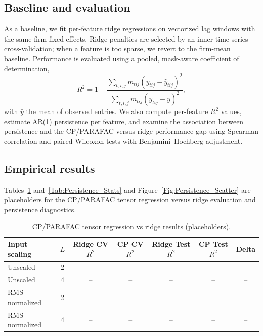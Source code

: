 \subsection{Baseline and evaluation}
\label{Section:Baseline_Eval}

As a baseline, we fit per-feature ridge regressions on vectorized lag windows with the same firm fixed effects. Ridge penalties are selected by an inner time-series cross-validation; when a feature is too sparse, we revert to the firm-mean baseline. Performance is evaluated using a pooled, mask-aware coefficient of determination,
\begin{equation}
R^2 = 1 - \frac{\sum_{t,i,j} m_{tij} (y_{tij} - \widehat{y}_{tij})^2}
{\sum_{t,i,j} m_{tij} (y_{tij} - \bar{y})^2},
\end{equation}
with $\bar{y}$ the mean of observed entries. We also compute per-feature $R^2$ values, estimate AR(1) persistence per feature, and examine the association between persistence and the CP/PARAFAC versus ridge performance gap using Spearman correlation and paired Wilcoxon tests with Benjamini--Hochberg adjustment.

\subsection{Empirical results}
\label{Section:Predictive_Results}

Tables~\ref{Tab:CP_Ridge_Results} and~\ref{Tab:Persistence_Stats} and
Figure~\ref{Fig:Persistence_Scatter} are placeholders for the CP/PARAFAC
tensor regression versus ridge evaluation and persistence diagnostics.

\begin{table}[ht]
\centering
\caption{CP/PARAFAC tensor regression vs ridge results (placeholders).}
\label{Tab:CP_Ridge_Results}
\begin{tabular}{lcccccc}
\toprule
Input scaling & $L$ & Ridge CV $R^2$ & CP CV $R^2$ & Ridge Test $R^2$ & CP Test $R^2$ & Delta \\
\midrule
Unscaled        & 2 & -- & -- & -- & -- & -- \\
Unscaled        & 4 & -- & -- & -- & -- & -- \\
RMS-normalized  & 2 & -- & -- & -- & -- & -- \\
RMS-normalized  & 4 & -- & -- & -- & -- & -- \\
\bottomrule
\end{tabular}
\end{table}

